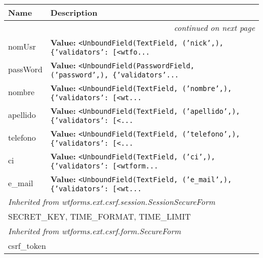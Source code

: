     \vspace{-1cm}
\hspace{\varindent}\begin{longtable}{|p{\varnamewidth}|p{\vardescrwidth}|l}
\cline{1-2}
\cline{1-2} \centering \textbf{Name} & \centering \textbf{Description}& \\
\cline{1-2}
\endhead\cline{1-2}\multicolumn{3}{r}{\small\textit{continued on next page}}\\\endfoot\cline{1-2}
\endlastfoot\raggedright n\-o\-m\-U\-s\-r\- & \raggedright \textbf{Value:} 
{\tt {\textless}UnboundField(TextField, ('nick',), \{'validators': [{\textless}wtfo\texttt{...}}&\\
\cline{1-2}
\raggedright p\-a\-s\-s\-W\-o\-r\-d\- & \raggedright \textbf{Value:} 
{\tt {\textless}UnboundField(PasswordField, ('password',), \{'validators'\texttt{...}}&\\
\cline{1-2}
\raggedright n\-o\-m\-b\-r\-e\- & \raggedright \textbf{Value:} 
{\tt {\textless}UnboundField(TextField, ('nombre',), \{'validators': [{\textless}wt\texttt{...}}&\\
\cline{1-2}
\raggedright a\-p\-e\-l\-l\-i\-d\-o\- & \raggedright \textbf{Value:} 
{\tt {\textless}UnboundField(TextField, ('apellido',), \{'validators': [{\textless}\texttt{...}}&\\
\cline{1-2}
\raggedright t\-e\-l\-e\-f\-o\-n\-o\- & \raggedright \textbf{Value:} 
{\tt {\textless}UnboundField(TextField, ('telefono',), \{'validators': [{\textless}\texttt{...}}&\\
\cline{1-2}
\raggedright c\-i\- & \raggedright \textbf{Value:} 
{\tt {\textless}UnboundField(TextField, ('ci',), \{'validators': [{\textless}wtform\texttt{...}}&\\
\cline{1-2}
\raggedright e\-\_\-m\-a\-i\-l\- & \raggedright \textbf{Value:} 
{\tt {\textless}UnboundField(TextField, ('e\_mail',), \{'validators': [{\textless}wt\texttt{...}}&\\
\cline{1-2}
\multicolumn{2}{|l|}{\textit{Inherited from wtforms.ext.csrf.session.SessionSecureForm}}\\
\multicolumn{2}{|p{\varwidth}|}{\raggedright SECRET\_KEY, TIME\_FORMAT, TIME\_LIMIT}\\
\cline{1-2}
\multicolumn{2}{|l|}{\textit{Inherited from wtforms.ext.csrf.form.SecureForm}}\\
\multicolumn{2}{|p{\varwidth}|}{\raggedright csrf\_token}\\
\cline{1-2}
\end{longtable}

